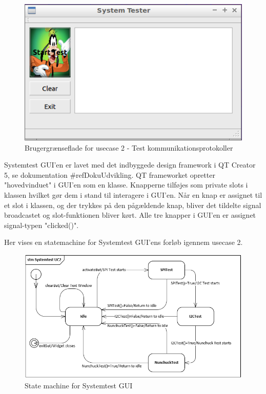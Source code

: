 \begin{figure}[H]
	\centering
	\includegraphics[width=\textwidth]{Afsnit/DesignOgImplementering/images/GUIPic}
	\caption{Brugergrænseflade for usecase 2 - Test kommunikationsprotokoller}
	\label{fig:GUIPic}
\end{figure}

Systemtest GUI'en er lavet med det indbyggede design framework i QT Creator 5\cite{Website:QTCreator}, se dokumentation \#refDokuUdvikling.
QT frameworket opretter "hovedvinduet" i GUI'en som en klasse. Knapperne tilføjes som private slots i klassen
hvilket gør dem i stand til interagere i GUI'en. Når en knap er assignet til et slot i klassen, og der trykkes på den pågældende knap, bliver det tildelte signal broadcastet
og slot-funktionen bliver kørt. Alle tre knapper i GUI'en er assignet signal-typen "clicked()".

Her vises en statemachine for Systemtest GUI'ens forløb igennem usecase 2.

\begin{figure}[H]
	\centering
	\includegraphics[width=1.2\textwidth]{Afsnit/DesignOgImplementering/images/StateMachineUC2}
	\caption{State machine for Systemtest GUI}
	\label{fig:StateMachineUC2}
\end{figure}

